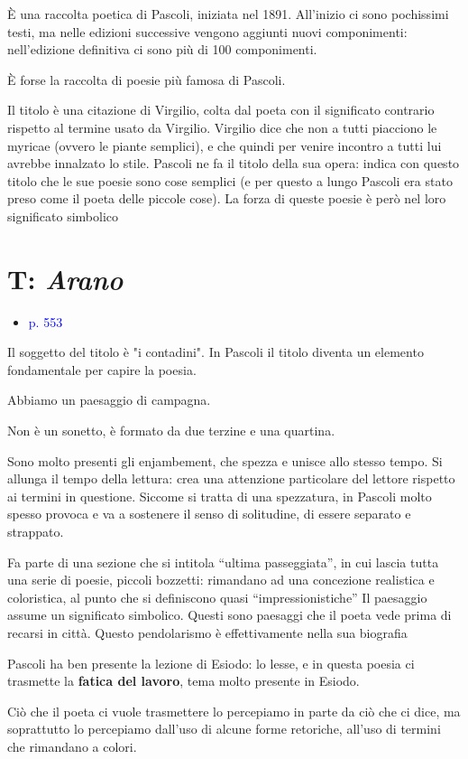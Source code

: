 \documentclass[a4paper, twoside, titlepage]{book}
\newcommand{\elenco}[1]{%
\begin{itemize}
#1
\end{itemize}}
\renewcommand{\emph}[1]{\textcolor{blue}{#1}}
\begin{document}
È una raccolta poetica di Pascoli, iniziata nel 1891. All'inizio ci sono pochissimi testi, ma nelle edizioni successive vengono aggiunti nuovi componimenti: nell'edizione definitiva ci sono più di 100 componimenti.

È forse la raccolta di poesie più famosa di Pascoli.

Il titolo è una citazione di Virgilio, colta dal poeta con il significato contrario rispetto al termine usato da Virgilio.
Virgilio dice che non a tutti piacciono le myricae (ovvero le piante semplici), e che quindi per venire incontro a tutti lui avrebbe innalzato lo stile.
Pascoli ne fa il titolo della sua opera: indica con questo titolo che le sue poesie sono cose semplici (e per questo a lungo Pascoli era stato preso come il poeta delle piccole cose). La forza di queste poesie è però nel loro significato simbolico

\section{T: \textit{Arano}}
\elenco{\item \emph{p. 553}}

Il soggetto del titolo è "i contadini". In Pascoli il titolo diventa un elemento fondamentale per capire la poesia.

Abbiamo un paesaggio di campagna.

Non è un sonetto, è formato da due terzine e una quartina.

Sono molto presenti gli enjambement, che spezza e unisce allo stesso tempo. Si allunga il tempo della lettura: crea una attenzione particolare del lettore rispetto ai termini in questione.
Siccome si tratta di una spezzatura, in Pascoli molto spesso provoca e va a sostenere il senso di solitudine, di essere separato e strappato.

Fa parte di una sezione che si intitola “ultima passeggiata”, in cui lascia tutta una serie di poesie, piccoli bozzetti: rimandano ad una concezione realistica e coloristica, al punto che si definiscono quasi “impressionistiche”
Il paesaggio assume un significato simbolico.
Questi sono paesaggi che il poeta vede prima di recarsi in città.
Questo pendolarismo è effettivamente nella sua biografia

Pascoli ha ben presente la lezione di Esiodo: lo lesse, e in questa poesia ci trasmette la \textbf{fatica del lavoro}, tema molto presente in Esiodo.

Ciò che il poeta ci vuole trasmettere lo percepiamo in parte da ciò che ci dice, ma soprattutto lo percepiamo dall’uso di alcune forme retoriche, all’uso di termini che rimandano a colori.
\end{document}

